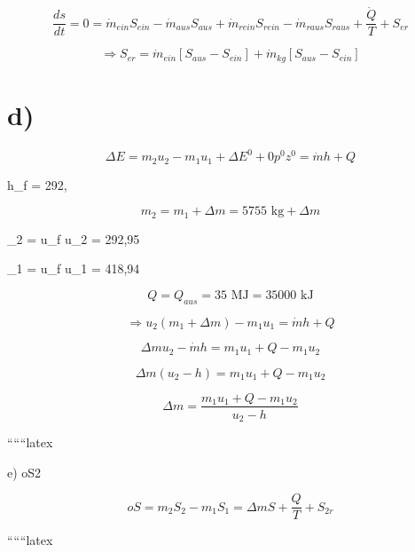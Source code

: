 \[
\frac{ds}{dt} = 0 = \dot{m}_{ein} S_{ein} - \dot{m}_{aus} S_{aus} + \dot{m}_{rein} S_{rein} - \dot{m}_{raus} S_{raus} + \frac{\dot{Q}}{T} + S_{er}
\]

\[
\Rightarrow S_{er} = \dot{m}_{ein} [S_{aus} - S_{ein}] + \dot{m}_{kg} [S_{aus} - S_{ein}]
\]

\section*{d)}



\[
\Delta E = m_2 u_2 - m_1 u_1 + \Delta E^0 + 0 p^0 z^0 = \dot{m} h + Q
\]

 h_f = 292,  

\[
m_2 = m_1 + \Delta m = 5755 \text{ kg} + \Delta m
\]

_2  = u_f  u_2 = 292,95 

_1  = u_f  u_1 = 418,94 

\[
Q = Q_{aus} = 35 \text{ MJ} = 35000 \text{ kJ}
\]

\[
\Rightarrow u_2 (m_1 + \Delta m) - m_1 u_1 = \dot{m} h + Q
\]

\[
\Delta m u_2 - \dot{m} h = m_1 u_1 + Q - m_1 u_2
\]

\[
\Delta m (u_2 - h) = m_1 u_1 + Q - m_1 u_2
\]

\[
\Delta m = \frac{m_1 u_1 + Q - m_1 u_2}{u_2 - h}
\]

``````latex


e) oS2

\[
oS = m_2 S_2 - m_1 S_1 = \Delta m S + \frac{Q}{T} + S_{2r}
\]

``````latex


